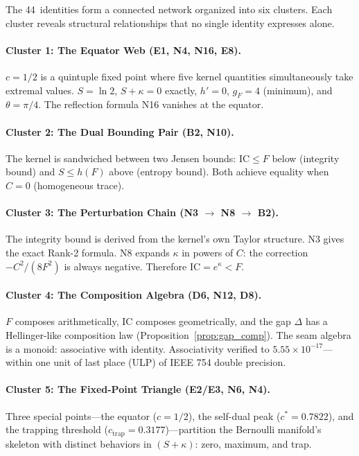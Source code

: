 \documentclass[
  aps,
  prd,
  twocolumn,
  superscriptaddress,
  nofootinbib,
  floatfix
]{revtex4-2}
\newcommand{\IC}{\mathrm{IC}}
\newcommand{\gF}{g_{\!F}}
\begin{document}
The 44~identities form a connected network organized into
six clusters.  Each cluster reveals structural relationships
that no single identity expresses alone.

\paragraph{Cluster 1: The Equator Web (E1, N4, N16, E8).}
$c = 1/2$ is a quintuple fixed point where five kernel quantities
simultaneously take extremal values.  $S = \ln 2$, $S + \kappa = 0$
exactly, $h' = 0$, $\gF = 4$ (minimum), and $\theta = \pi/4$.
The reflection formula N16 vanishes at the equator.

\paragraph{Cluster 2: The Dual Bounding Pair (B2, N10).}
The kernel is sandwiched between two Jensen bounds:
$\IC \leq F$ below (integrity bound) and $S \leq h(F)$ above
(entropy bound).  Both achieve equality when $C = 0$
(homogeneous trace).

\paragraph{Cluster 3: The Perturbation Chain (N3 $\to$ N8 $\to$ B2).}
The integrity bound is derived from the kernel's own Taylor
structure.  N3 gives the exact Rank-2 formula.  N8 expands
$\kappa$ in powers of $C$: the correction $-C^2/(8F^2)$ is always
negative.  Therefore $\IC = e^\kappa < F$.

\paragraph{Cluster 4: The Composition Algebra (D6, N12, D8).}
$F$ composes arithmetically, $\IC$ composes geometrically, and
the gap $\Delta$ has a Hellinger-like composition law
(Proposition~\ref{prop:gap_comp}).
The seam algebra is a monoid: associative with identity.
Associativity verified to $5.55 \times 10^{-17}$---within one
unit of last place (ULP) of IEEE 754 double precision.

\paragraph{Cluster 5: The Fixed-Point Triangle (E2/E3, N6, N4).}
Three special points---the equator ($c = 1/2$), the self-dual peak
($c^* = 0.7822$), and the trapping threshold
($c_\mathrm{trap} = 0.3177$)---partition the Bernoulli manifold's
skeleton with distinct behaviors in $(S + \kappa)$:
zero, maximum, and trap.
\end{document}
